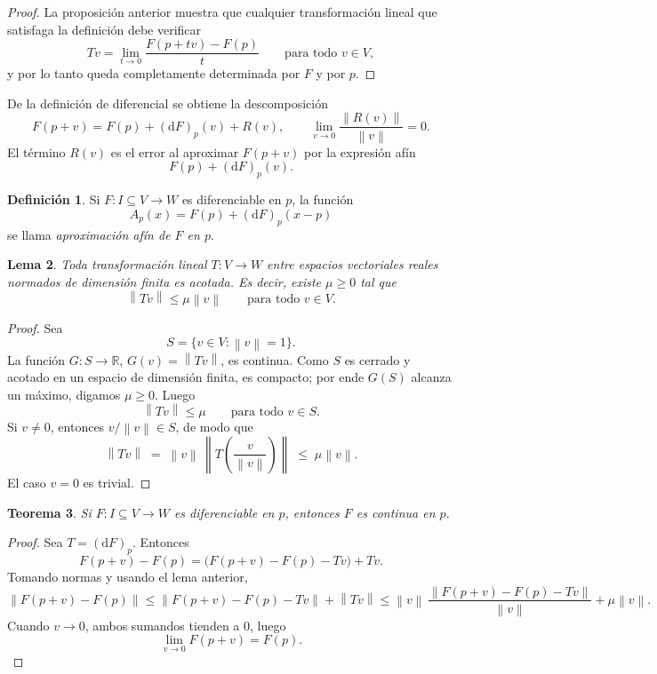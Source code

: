 \documentclass[11pt]{article}
\newtheorem{theorem}{Teorema}
\newtheorem{lemma}[theorem]{Lema}
\theoremstyle{definition}
\newtheorem{definition}[theorem]{Definici\'on}
\theoremstyle{remark}
\newcommand{\R}{\mathbb{R}}
\newcommand{\norm}[1]{\left\lVert #1 \right\rVert}
\newcommand{\dd}{\mathrm{d}}
\begin{document}
\begin{proof}
La proposici\'on anterior muestra que cualquier transformaci\'on lineal que satisfaga la definici\'on debe verificar
\[
Tv = \lim_{t \to 0} \frac{F(p+tv)-F(p)}{t}
\qquad \text{para todo } v \in V,
\]
y por lo tanto queda completamente determinada por $F$ y por $p$.
\end{proof}

De la definici\'on de diferencial se obtiene la descomposici\'on
\[
F(p+v)=F(p)+(\dd F)_p(v)+R(v),
\qquad
\lim_{v\to 0}\frac{\norm{R(v)}}{\norm{v}}=0.
\]
El t\'ermino $R(v)$ es el error al aproximar $F(p+v)$ por la expresi\'on af\'in
\[
F(p)+(\dd F)_p(v).
\]

\begin{definition}
Si $F \colon I \subseteq V \to W$ es diferenciable en $p$, la funci\'on
\[
A_p(x)=F(p)+(\dd F)_p(x-p)
\]
se llama \emph{aproximaci\'on af\'in de $F$ en $p$}.
\end{definition}

\begin{lemma}
Toda transformaci\'on lineal $T \colon V \to W$ entre espacios vectoriales reales normados de dimensi\'on finita es acotada. Es decir, existe $\mu \ge 0$ tal que
\[
\norm{Tv}\le \mu \norm{v}
\qquad \text{para todo } v \in V.
\]
\end{lemma}

\begin{proof}
Sea
\[
S=\{v\in V:\norm{v}=1\}.
\]
La funci\'on $G \colon S \to \R$, $G(v)=\norm{Tv}$, es continua. Como $S$ es cerrado y acotado en un espacio de dimensi\'on finita, es compacto; por ende $G(S)$ alcanza un m\'aximo, digamos $\mu\ge 0$. Luego
\[
\norm{Tv}\le \mu
\qquad \text{para todo } v\in S.
\]
Si $v\neq 0$, entonces $v/\norm{v}\in S$, de modo que
\[
\norm{Tv}
\;=\;
\norm{v}\,\norm{T\!\left(\frac{v}{\norm{v}}\right)}
\;\le\;
\mu \norm{v}.
\]
El caso $v=0$ es trivial.
\end{proof}

\begin{theorem}
Si $F \colon I \subseteq V \to W$ es diferenciable en $p$, entonces $F$ es continua en $p$.
\end{theorem}

\begin{proof}
Sea $T=(\dd F)_p$. Entonces
\[
F(p+v)-F(p)=\bigl(F(p+v)-F(p)-Tv\bigr)+Tv.
\]
Tomando normas y usando el lema anterior,
\[
\norm{F(p+v)-F(p)}
\le
\norm{F(p+v)-F(p)-Tv}+\norm{Tv}
\le
\norm{v}\,\frac{\norm{F(p+v)-F(p)-Tv}}{\norm{v}}+\mu \norm{v}.
\]
Cuando $v\to 0$, ambos sumandos tienden a $0$, luego
\[
\lim_{v\to 0} F(p+v)=F(p).
\]
\end{proof}
\end{document}
